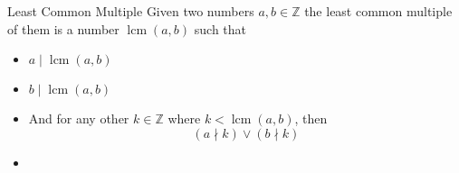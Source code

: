 \documentclass{standalone}
\begin{document}
\begin{defn*}{Least Common Multiple}
  Given two numbers $ a,b \in \mathbb{Z}$ the least common multiple of them is a number $ \operatorname{lcm}\left(a,b\right)$ such that
  \begin{itemize}
    \item $ a \mid \operatorname{lcm}\left(a,b\right) $
    \item $ b \mid \operatorname{lcm}\left(a,b\right) $
    \item And for any other $ k \in \mathbb{Z}$ where $ k < \operatorname{lcm}\left(a,b\right) $, then 
      \[
      \left( a \nmid k \right) \lor \left( b \nmid k \right)
      \]
    \item 
  \end{itemize}
\end{defn*}
\end{document}
